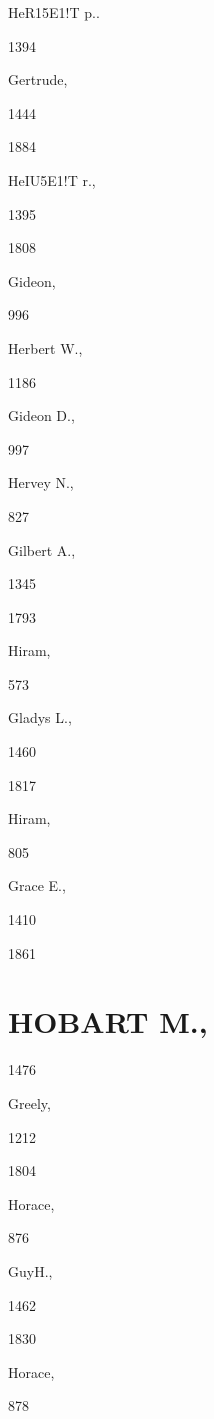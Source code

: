\documentclass{book}
\begin{document}
{HeR15E1!T p.. 


1394 




Gertrude, 


1444 


1884 


HeIU5E1!T r., 


1395 


1808 


Gideon, 


996 




Herbert W., 


1186 




Gideon D., 


997 




Hervey N., 


827 




Gilbert A., 


1345 


1793 


Hiram, 


573 




Gladys L., 


1460 


1817 


Hiram, 


805 




Grace E., 


1410 


1861 


\chapter{HOBART M.,}

1476 




Greely, 


1212 


1804 


Horace, 


876 




GuyH., 


1462 


1830 


Horace, 


878 




}
\end{document}
